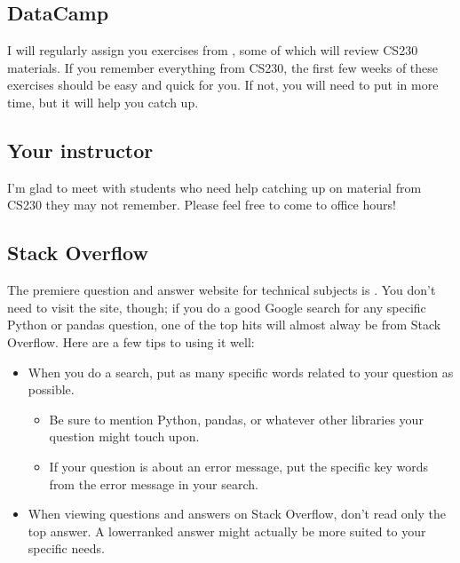 \documentclass[letterpaper,10pt,english]{jupyterBook}
\begin{document}
\subsection{DataCamp}
\label{\detokenize{chapter-4-review-of-python-and-pandas:datacamp}}
\sphinxAtStartPar
I will regularly assign you exercises from , some of which will review CS230 materials.  If you remember everything from CS230, the first few weeks of these exercises should be easy and quick for you.  If not, you will need to put in more time, but it will help you catch up.


\subsection{Your instructor}
\label{\detokenize{chapter-4-review-of-python-and-pandas:your-instructor}}
\sphinxAtStartPar
I’m glad to meet with students who need help catching up on material from CS230 they may not remember.  Please feel free to come to office hours!


\subsection{Stack Overflow}
\label{\detokenize{chapter-4-review-of-python-and-pandas:stack-overflow}}
\sphinxAtStartPar
The premiere question and answer website for technical subjects is .  You don’t need to visit the site, though; if you do a good Google search for any specific Python or pandas question, one of the top hits will almost alway be from Stack Overflow.  Here are a few tips to using it well:
\begin{itemize}
\item {} 
\sphinxAtStartPar
When you do a search, put as many specific words related to your question as possible.
\begin{itemize}
\item {} 
\sphinxAtStartPar
Be sure to mention Python, pandas, or whatever other libraries your question might touch upon.

\item {} 
\sphinxAtStartPar
If your question is about an error message, put the specific key words from the error message in your search.

\end{itemize}

\item {} 
\sphinxAtStartPar
When viewing questions and answers on Stack Overflow, don’t read only the top answer.  A lower\sphinxhyphen{}ranked answer might actually be more suited to your specific needs.

\end{itemize}
\end{document}
